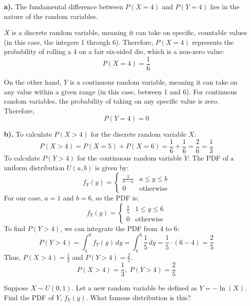\documentclass[a4paper, 10pt]{article}
\begin{document}
\begin{solution}
\textbf{a).} The fundamental difference between \( P(X = 4) \) and \( P(Y = 4) \) lies in the nature of the random variables.

\vspace{2mm}

\( X \) is a discrete random variable, meaning it can take on specific, countable values (in this case, the integers 1 through 6).
Therefore, \( P(X = 4) \) represents the probability of rolling a 4 on a fair six-sided die, which is a non-zero value:
\[ P(X = 4) = \frac{1}{6} \]

\vspace{2mm}

On the other hand, \( Y \) is a continuous random variable, meaning it can take on any value within a given range (in this case, between 1 and 6).
For continuous random variables, the probability of taking on any specific value is zero. Therefore,
\[ P(Y = 4) = 0 \]

\textbf{b).} To calculate \( P(X > 4) \) for the discrete random variable \( X \):
\[ P(X > 4) = P(X = 5) + P(X = 6) = \frac{1}{6} + \frac{1}{6} = \frac{2}{6} = \frac{1}{3} \]
To calculate \( P(Y > 4) \) for the continuous random variable \( Y \):
The PDF of a uniform distribution \( U(a, b) \) is given by:
\[ f_Y(y) = \begin{cases}
    \frac{1}{b-a} & a \leq y \leq b \\
    0 & \text{otherwise}
\end{cases} \]
For our case, \( a = 1 \) and \( b = 6 \), so the PDF is:
\[ f_Y(y) = \begin{cases}
    \frac{1}{5} & 1 \leq y \leq 6 \\
    0 & \text{otherwise}
\end{cases} \]
To find \( P(Y > 4) \), we can integrate the PDF from 4 to 6:
\[ P(Y > 4) = \int_{4}^{6} f_Y(y) \, dy = \int_{4}^{6} \frac{1}{5} \, dy = \frac{1}{5} \cdot (6 - 4) = \frac{2}{5} \]
Thus, \( P(X > 4) = \frac{1}{3} \) and \( P(Y > 4) = \frac{2}{5} \).
\[\boxed{P(X > 4) = \frac{1}{3}, \; P(Y > 4) = \frac{2}{5}}\]
\end{solution}

\newpage

\begin{problem}
Suppose \( X \sim U(0, 1) \). Let a new random variable be defined as \( Y = -\ln(X) \).
Find the PDF of \( Y \), \( f_Y(y) \). What famous distribution is this?
\end{problem}
\end{document}
